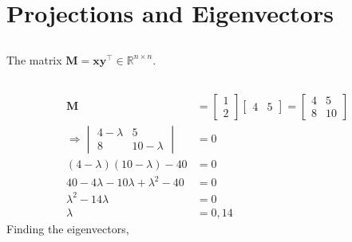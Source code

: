 \documentclass[]{article}
\newcommand{\tpose}[1]{#1^{\! \top} \!}
\begin{document}
\section{Projections and Eigenvectors}

\subsection{}

The matrix \(\bm{M} = \bm{x} \tpose{\bm{y}} \in \mathbb{R}^{n \times n}\).

\subsection{}

\begin{align}
	\bm{M} &=
	\begin{bmatrix}
	1 \\
	2
	\end{bmatrix}
	\begin{bmatrix}
	4 & 5
	\end{bmatrix}
	=
	\begin{bmatrix}
	4 & 5 \\
	8 & 10
	\end{bmatrix} \\
	\Rightarrow \begin{vmatrix}
	4 - \lambda & 5 \\
	8 & 10 - \lambda
	\end{vmatrix} &= 0 \\
	(4 - \lambda) (10 - \lambda) - 40 &= 0 \\
	40 - 4\lambda - 10\lambda + \lambda^2 - 40 &= 0 \\
	\lambda^2 - 14\lambda &= 0 \\
	\lambda &= 0, 14
\end{align}
Finding the eigenvectors,
\end{document}
